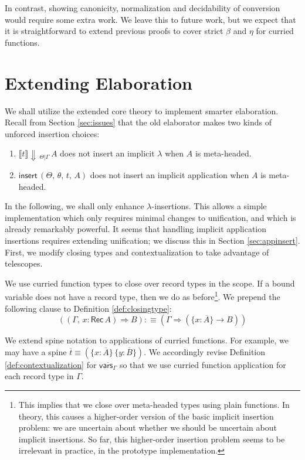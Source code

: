 \documentclass[acmsmall,review,anonymous,prologue,dvipsnames]{acmart}\settopmatter{printfolios=true,printccs=false,printacmref=false}
\newcommand{\To}{\Rightarrow}
\newcommand{\echeck}[4]{\llbracket#1\rrbracket\!\Downarrow\,_{#2|#3}\,#4}
\newcommand{\einsert}{\mathsf{insert}}
\newcommand{\Rec}{\mathsf{Rec}}
\newcommand{\ol}[1]{\overline{#1}}
\theoremstyle{remark}
\begin{document}
In contrast, showing canonicity, normalization and decidability of conversion
would require some extra work. We leave this to future work, but we expect that
it is straightforward to extend previous proofs to cover strict $\beta$ and
$\eta$ for curried functions.

\section{Extending Elaboration}
\label{sec:extending_elaboration}

We shall utilize the extended core theory to implement smarter
elaboration. Recall from Section \ref{sec:issues} that the old elaborator makes
two kinds of unforced insertion choices:
\begin{enumerate}
\item $\echeck{t}{\Theta}{\Gamma}{A}$ does not insert an implicit $\lambda$ when $A$ is meta-headed.
\item $\einsert\,(\Theta,\,\theta,\,t,\,A)$ does not insert an implicit application when $A$ is meta-headed.
\end{enumerate}
In the following, we shall only enhance $\lambda$-insertions. This allows a
simple implementation which only requires minimal changes to unification, and
which is already remarkably powerful. It seems that handling implicit
application insertions requires extending unification; we discuss this in
Section \ref{sec:appinsert}. First, we modify closing types and
contextualization to take advantage of telescopes.

\begin{definition}
We use curried function types to close over record types in the scope. If a
bound variable does not have a record type, then we do as before\footnote{This
  implies that we close over meta-headed types using plain functions. In theory,
  this causes a higher-order version of the basic implicit insertion problem: we
  are uncertain about whether we should be uncertain about implicit
  insertions. So far, this higher-order insertion problem seems to be
  irrelevant in practice, in the prototype implementation.}. We prepend the
following clause to Definition
\ref{def:closingtype}:
\[
  ((\Gamma,\, x : \Rec\,A) \To B) :\equiv (\Gamma \To (\{x : \ol{A}\} \to B))
\]
\end{definition}
\begin{definition}[Contextualization]
We extend spine notation to applications of curried functions. For example, we
may have a spine $\ol{t} \equiv (\{x : \ol{A}\}\,\{y : \ol{B}\})$. We
accordingly revise Definition \ref{def:contextualization} for
$\overline{\mathsf{vars}_{\Gamma}}$ so that we use curried function application
for each record type in $\Gamma$.
\end{definition}
\end{document}
